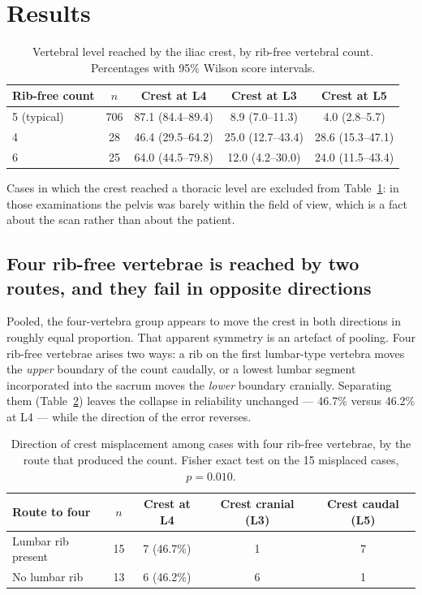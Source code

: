 \documentclass[11pt,a4paper]{article}
\begin{document}
\section{Results}

\begin{table}[h]
\centering
\caption{Vertebral level reached by the iliac crest, by rib-free vertebral count.
Percentages with 95\% Wilson score intervals.}
\label{tab:crest}
\begin{tabular}{lcccc}
\toprule
Rib-free count & $n$ & Crest at L4 & Crest at L3 & Crest at L5 \\
\midrule
5 (typical) & 706 & 87.1 (84.4--89.4) & 8.9 (7.0--11.3) & 4.0 (2.8--5.7) \\
4 & 28 & 46.4 (29.5--64.2) & 25.0 (12.7--43.4) & 28.6 (15.3--47.1) \\
6 & 25 & 64.0 (44.5--79.8) & 12.0 (4.2--30.0) & 24.0 (11.5--43.4) \\
\bottomrule
\end{tabular}
\end{table}

Cases in which the crest reached a thoracic level are excluded from
Table~\ref{tab:crest}: in those examinations the pelvis was barely within the field of
view, which is a fact about the scan rather than about the patient.

\subsection{Four rib-free vertebrae is reached by two routes, and they fail in opposite
directions}

Pooled, the four-vertebra group appears to move the crest in both directions in roughly
equal proportion. That apparent symmetry is an artefact of pooling. Four rib-free
vertebrae arises two ways: a rib on the first lumbar-type vertebra moves the \emph{upper}
boundary of the count caudally, or a lowest lumbar segment incorporated into the sacrum
moves the \emph{lower} boundary cranially. Separating them (Table~\ref{tab:route}) leaves
the collapse in reliability unchanged --- 46.7\% versus 46.2\% at L4 --- while the
direction of the error reverses.

\begin{table}[h]
\centering
\caption{Direction of crest misplacement among cases with four rib-free vertebrae, by the
route that produced the count. Fisher exact test on the 15 misplaced cases,
$p = 0.010$.}
\label{tab:route}
\begin{tabular}{lcccc}
\toprule
Route to four & $n$ & Crest at L4 & Crest cranial (L3) & Crest caudal (L5) \\
\midrule
Lumbar rib present & 15 & 7 (46.7\%) & 1 & 7 \\
No lumbar rib      & 13 & 6 (46.2\%) & 6 & 1 \\
\bottomrule
\end{tabular}
\end{table}
\end{document}
